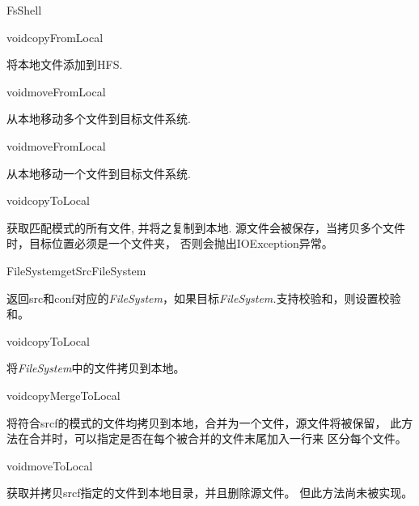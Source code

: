 \begin{XeClass}{FsShell}
    \begin{XeMethod}{}{void}{copyFromLocal}
         
 将本地文件添加到HFS.

    \end{XeMethod}

    \begin{XeMethod}{}{void}{moveFromLocal}
         
 从本地移动多个文件到目标文件系统.

    \end{XeMethod}

    \begin{XeMethod}{}{void}{moveFromLocal}
         
 从本地移动一个文件到目标文件系统.

    \end{XeMethod}

    \begin{XeMethod}{}{void}{copyToLocal}
         
 获取匹配模式的所有文件, 并将之复制到本地.
 源文件会被保存，当拷贝多个文件时，目标位置必须是一个文件夹，
 否则会抛出IOException异常。

    \end{XeMethod}

    \begin{XeMethod}{\XePrivate}{FileSystem}{getSrcFileSystem}
         
 返回src和conf对应的\emph{FileSystem}，如果目标\emph{FileSystem.}支持校验和，则设置校验和。

    \end{XeMethod}

    \begin{XeMethod}{\XePrivate}{void}{copyToLocal}
         
 将\emph{FileSystem}中的文件拷贝到本地。

    \end{XeMethod}

    \begin{XeMethod}{}{void}{copyMergeToLocal}
         
 将符合srcf的模式的文件均拷贝到本地，合并为一个文件，源文件将被保留，
 此方法在合并时，可以指定是否在每个被合并的文件末尾加入一行来
 区分每个文件。

    \end{XeMethod}

    \begin{XeMethod}{}{void}{moveToLocal}
         
 获取并拷贝srcf指定的文件到本地目录，并且删除源文件。
 但此方法尚未被实现。


\end{XeMethod}
\end{XeClass}
